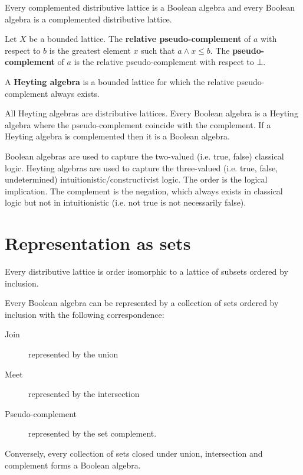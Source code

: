 \documentclass{article}
\newcommand{\marginleft}[1] {\reversemarginpar\marginpar{#1}}
\begin{document}
\begin{prop}
	Every complemented distributive lattice is a Boolean algebra and every Boolean algebra is a complemented distributive lattice.
\end{prop}

\begin{defn}
	Let $X$ be \marginleft{Pseudo-complement} a bounded lattice. The \textbf{relative pseudo-complement} of $a$ with respect to $b$ is the greatest element $x$ such that $a \wedge x \leq b$. The \textbf{pseudo-complement} of $a$ is the relative pseudo-complement with respect to $\bot$.
\end{defn}

\begin{defn}
	A \textbf{Heyting algebra} \marginleft{Heyting algebra} is a bounded lattice for which the relative pseudo-complement always exists.
\end{defn}

\begin{prop}
	All Heyting algebras are distributive lattices. Every Boolean algebra is a Heyting algebra where the pseudo-complement coincide with the complement. If a Heyting algebra is complemented then it is a Boolean algebra.
\end{prop}

\begin{remark}
	Boolean algebras are used to capture the two-valued (i.e. true, false) classical logic. Heyting algebras are used to capture the three-valued (i.e. true, false, undetermined) intuitionistic/constructivist logic. The order is the logical implication. The complement is the negation, which always exists in classical logic but not in intuitionistic (i.e. not true is not necessarily false).
\end{remark}

\section{Representation as sets}

\begin{prop}
	Every distributive lattice is order isomorphic to a lattice of subsets ordered by inclusion.
\end{prop}

\begin{prop}
	Every Boolean algebra can be represented by a collection of sets ordered by inclusion with the following correspondence:
	\begin{description}
		\item[Join] represented by the union
		\item[Meet] represented by the intersection
		\item[Pseudo-complement] represented by the set complement.
	\end{description}
	Conversely, every collection of sets closed under union, intersection and complement forms a Boolean algebra.
\end{prop}
\end{document}
